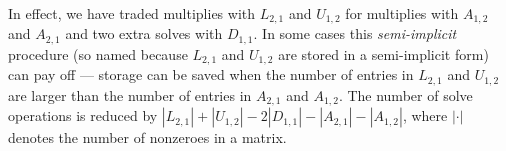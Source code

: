 In effect, we have traded multiplies with $L_{2,1}$ and $U_{1,2}$
for multiplies with $A_{1,2}$ and $A_{2,1}$ and
two extra solves with $D_{1,1}$.
In some cases this {\it semi-implicit} procedure
(so named because $L_{2,1}$ and $U_{1,2}$ are stored in a
semi-implicit form) can pay off ---
storage can be saved when the number of entries in
$L_{2,1}$ and $U_{1,2}$ are larger than the number of entries in
$A_{2,1}$ and $A_{1,2}$.
The number of solve operations is reduced by 
$|L_{2,1}| + |U_{1,2}| - 2|D_{1,1}| -|A_{2,1}| - |A_{1,2}|$,
where $|\cdot|$ denotes the number of nonzeroes in a matrix.

